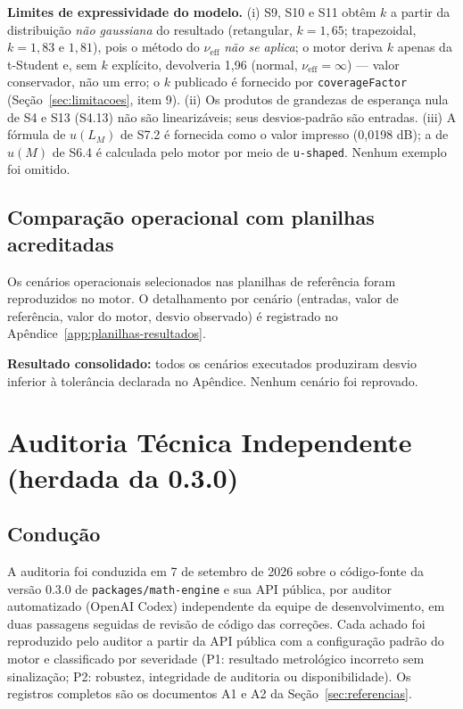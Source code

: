 \documentclass[11pt,a4paper]{article}
\newcommand{\auditDate}{7 de setembro de 2026}
\newcommand{\auditedVersion}{0.3.0}
\begin{document}
\textbf{Limites de expressividade do modelo.} (i) S9, S10 e S11 obtêm \(k\) a partir da distribuição \emph{não gaussiana} do resultado (retangular, \(k = 1{,}65\); trapezoidal, \(k = 1{,}83\) e \(1{,}81\)), pois o método do \(\nu_{\text{eff}}\) \emph{não se aplica}; o motor deriva \(k\) apenas da t-Student e, sem \(k\) explícito, devolveria 1,96 (normal, \(\nu_{\text{eff}} = \infty\)) --- valor conservador, não um erro; o \(k\) publicado é fornecido por \texttt{coverageFactor} (Seção~\ref{sec:limitacoes}, item 9). (ii) Os produtos de grandezas de esperança nula de S4 e S13 (S4.13) não são linearizáveis; seus desvios-padrão são entradas. (iii) A fórmula de \(u(L_M)\) de S7.2 é fornecida como o valor impresso (0,0198 dB); a de \(u(M)\) de S6.4 é calculada pelo motor por meio de \texttt{u-shaped}. Nenhum exemplo foi omitido.


\subsection{Comparação operacional com planilhas acreditadas}

Os cenários operacionais selecionados nas planilhas de referência foram reproduzidos no motor. O detalhamento por cenário (entradas, valor de referência, valor do motor, desvio observado) é registrado no Apêndice~\ref{app:planilhas-resultados}.

\textbf{Resultado consolidado:} todos os cenários executados produziram desvio inferior à tolerância declarada no Apêndice. Nenhum cenário foi reprovado.

\section{Auditoria Técnica Independente (herdada da \auditedVersion)}
\label{sec:auditoria}

\subsection{Condução}

A auditoria foi conduzida em \auditDate{} sobre o código-fonte da versão \auditedVersion{} de \texttt{packages/math-engine} e sua API pública, por auditor automatizado (OpenAI Codex) independente da equipe de desenvolvimento, em duas passagens seguidas de revisão de código das correções. Cada achado foi reproduzido pelo auditor a partir da API pública com a configuração padrão do motor e classificado por severidade (P1: resultado metrológico incorreto sem sinalização; P2: robustez, integridade de auditoria ou disponibilidade). Os registros completos são os documentos A1 e A2 da Seção~\ref{sec:referencias}.
\end{document}
